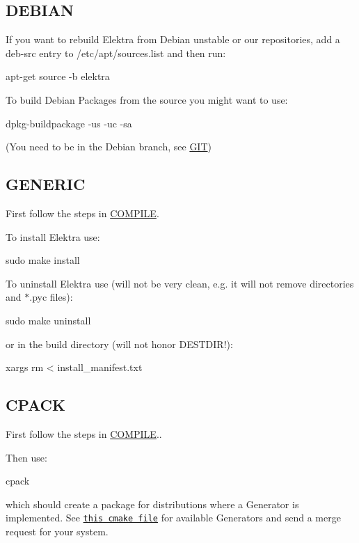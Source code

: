 \subsection*{D\+E\+B\+I\+A\+N}

If you want to rebuild Elektra from Debian unstable or our repositories, add a {\ttfamily deb-\/src} entry to {\ttfamily /etc/apt/sources.list} and then run\+: \begin{DoxyVerb}    apt-get source -b elektra
\end{DoxyVerb}


To build Debian Packages from the source you might want to use\+: \begin{DoxyVerb}    dpkg-buildpackage -us -uc -sa
\end{DoxyVerb}


(You need to be in the Debian branch, see \hyperlink{doc_GIT_md}{G\+I\+T})

\subsection*{G\+E\+N\+E\+R\+I\+C}

First follow the steps in \hyperlink{doc_COMPILE_md}{C\+O\+M\+P\+I\+L\+E}.

To install Elektra use\+: \begin{DoxyVerb}    sudo make install
\end{DoxyVerb}


To uninstall Elektra use (will not be very clean, e.\+g. it will not remove directories and {\ttfamily $\ast$.pyc} files)\+: \begin{DoxyVerb}    sudo make uninstall
\end{DoxyVerb}


or in the build directory (will not honor D\+E\+S\+T\+D\+I\+R!)\+: \begin{DoxyVerb}    xargs rm < install_manifest.txt
\end{DoxyVerb}


\subsection*{C\+P\+A\+C\+K}

First follow the steps in \hyperlink{doc_COMPILE_md}{C\+O\+M\+P\+I\+L\+E}..

Then use\+: \begin{DoxyVerb}    cpack
\end{DoxyVerb}


which should create a package for distributions where a Generator is implemented. See \href{/home/markus/Projekte/Elektra/current/cmake/ElektraPackaging.cmake}{\tt this cmake file} for available Generators and send a merge request for your system.

